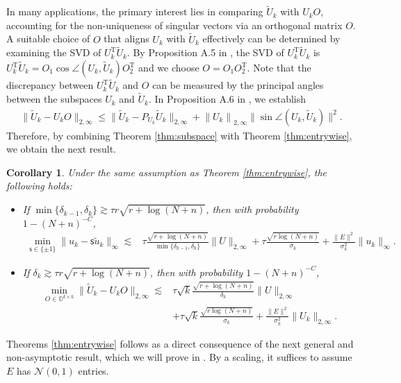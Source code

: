 \documentclass[reqno]{amsart}
\newcommand{\T}{\mathrm{T}}
\theoremstyle{plain}
\newtheorem{corollary}[theorem]{Corollary}
\theoremstyle{definition}
\begin{document}
In many applications, the primary interest lies in comparing  $\widetilde U_k$ with $U_k O$, accounting for the non-uniqueness of singular vectors via an orthogonal matrix $O$. A suitable choice of $O$ that aligns $U_k$ with $\widetilde U_k$ effectively can be determined by examining the SVD of $U_k^\T \widetilde U_k$. By Proposition A.5 in \cite{WangSupp24}, the SVD of $U_k^\T \widetilde U_k$ is $U_k^\T \widetilde U_k =O_1 \cos\angle(U_k, \widetilde U_k) O_2^\T$ and we choose $O=O_1 O_2^\T$. Note that the discrepancy between $U_k^\T \widetilde U_k$ and $O$ can be measured by the principal angles between the subspaces $U_k$ and $\widetilde U_k$. In Proposition A.6 in \cite{WangSupp24}, we establish
\begin{align}\label{eq:propbd}
 \| \widetilde{U}_{k} - U_k O \|_{2,\infty}\le \| \widetilde{U}_{k} - P_{U_{k}} \widetilde{U}_{k} \|_{2,\infty} + \left\|U_k \right\|_{2,\infty} \|\sin\angle(U_k, \widetilde{U}_{k}) \|^2.
\end{align}
Therefore, by combining Theorem \ref{thm:subspace} with Theorem \ref{thm:entrywise}, we obtain the next result.
\begin{corollary}\label{cor:matrix}Under the same assumption as Theorem \ref{thm:entrywise}, the following holds:
\begin{itemize}
\item If $\min\{\delta_{k-1},\delta_{k}\} \gtrsim  \tau r\sqrt{r+\log(N+n)}$, then with probability $1-(N+n)^{-C}$,
\begin{align*}
\min_{\mathsf s\in\{\pm1\}}\|u_k  - \mathsf s \widetilde u_k\|_{\infty} \lesssim&   \tau \frac{\sqrt{r+\log(N+n)}}{\min\{\delta_{k-1},\delta_{k}\}}  \|U\|_{2,\infty} +  \tau \frac{\sqrt{r\log(N+n)}}{\sigma_k} + \frac{\|E\|^2}{\sigma_k^2} \|u_k\|_\infty . 
\end{align*}
\item If $\delta_{k} \gtrsim  \tau r\sqrt{r+\log(N+n)}$, then with probability $1-(N+n)^{-C}$,
\begin{align*}
\min_{O\in \mathbb O^{k\times k}} \| \widetilde{U}_{k} - U_k O \|_{2,\infty} \lesssim &  \tau \sqrt{k}\frac{\sqrt{r+\log(N+n)}}{\delta_{k}}  \|U\|_{2,\infty}\\
& +  \tau \sqrt{k}\frac{\sqrt{r\log(N+n)}}{\sigma_k}  +  \frac{\|E\|^2}{\sigma_k^2} \|U_k\|_{2,\infty}.
\end{align*}
\end{itemize}
\end{corollary}

Theorems \ref{thm:entrywise} follows as a direct consequence of the next general and non-asymptotic result, which we will prove in \cite{WangSupp24}.  By a scaling, it suffices to assume $E$ has $\mathcal N(0,1)$ entries.
\end{document}
